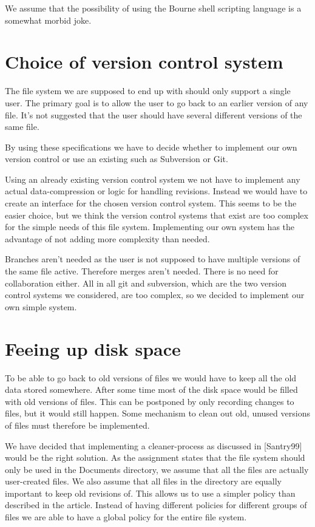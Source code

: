 \documentclass[12pt]{article}
\begin{document}
We assume that the possibility of using the Bourne shell scripting
language is a somewhat morbid joke.
 
\section{Choice of version control system}
The file system we are supposed to end up with should only support a
single user.
The primary goal is to allow the user to go back to an earlier version
of any file. It's not suggested that the user should have several
different versions of the same file.

By using these specifications we have to decide whether to implement
our own version control or use an existing such as Subversion or Git.

Using an already existing version control system we not have to
implement any actual data-compression or logic for handling revisions.
Instead we would have to create an interface for the chosen version
control system. This seems to be the easier choice, but we think the
version control systems that exist are too complex for the simple
needs of this file system. Implementing our own system has the
advantage of not adding more complexity than needed.

Branches aren't needed as the user is not supposed to have multiple
versions of the same file active. Therefore merges aren't needed.
There is no need for collaboration either. All in all git and
subversion, which are the two version control systems we considered,
are too complex, so we decided to implement our own simple system.
 
\section{Feeing up disk space}

To be able to go back to old versions of files we would have to keep
all the old data stored somewhere. After some time most of the disk
space would be filled with old versions of files. This can be
postponed by only recording changes to files, but it would still
happen. Some mechanism to clean out old, unused versions of files must
therefore be implemented.

We have decided that implementing a cleaner-process as discussed in
[Santry99] would be the right solution. As the assignment states that
the file system should only be used in the Documents directory, we
assume that all the files are actually user-created files. We also
assume that all files in the directory are equally important to keep
old revisions of. This allows us to use a simpler policy than
described in the article. Instead of having different policies for
different groups of files we are able to have a global policy for the
entire file system.
\end{document}
